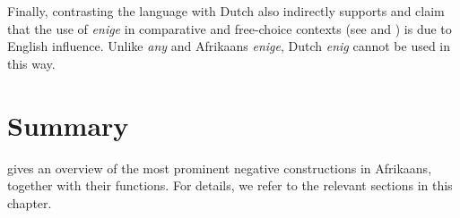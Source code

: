 \documentclass[output=paper,colorlinks,citecolor=brown]{langscibook}
\begin{document}
Finally, contrasting the language with Dutch also indirectly supports  and  claim that the use of \textit{enige} in comparative and free-choice contexts (see  and ) is due to English influence. Unlike \textit{any} and Afrikaans \textit{enige}, Dutch \textit{enig} cannot be used in this way.

\section{Summary}
 gives an overview of the most prominent negative constructions in Afrikaans, together with their functions. For details, we refer to the relevant sections in this chapter. 
%
%
%
%
%
%
\end{document}
